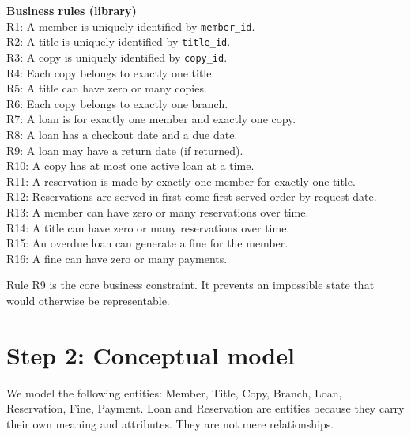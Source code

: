 \begin{examplebox}
\textbf{Business rules (library)}\\
R1: A member is uniquely identified by \texttt{member\_id}.\\
R2: A title is uniquely identified by \texttt{title\_id}.\\
R3: A copy is uniquely identified by \texttt{copy\_id}.\\
R4: Each copy belongs to exactly one title.\\
R5: A title can have zero or many copies.\\
R6: Each copy belongs to exactly one branch.\\
R7: A loan is for exactly one member and exactly one copy.\\
R8: A loan has a checkout date and a due date.\\
R9: A loan may have a return date (if returned).\\
R10: A copy has at most one active loan at a time.\\
R11: A reservation is made by exactly one member for exactly one title.\\
R12: Reservations are served in first-come-first-served order by request date.\\
R13: A member can have zero or many reservations over time.\\
R14: A title can have zero or many reservations over time.\\
R15: An overdue loan can generate a fine for the member.\\
R16: A fine can have zero or many payments.
\end{examplebox}

Rule R9 is the core business constraint.
It prevents an impossible state that would otherwise be representable.

\section{Step 2: Conceptual model}
We model the following entities:
Member, Title, Copy, Branch, Loan, Reservation, Fine, Payment.
Loan and Reservation are entities because they carry their own meaning and attributes.
They are not mere relationships.

